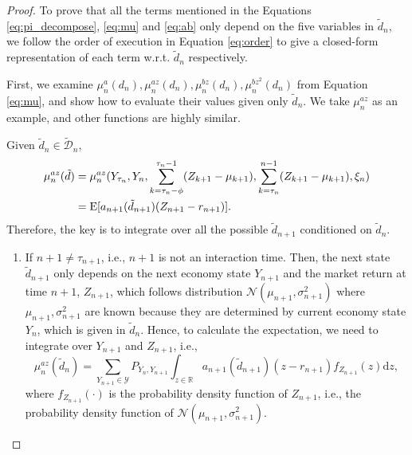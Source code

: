 \begin{proof} To prove that all the terms mentioned in the Equations \eqref{eq:pi_decompose}, \eqref{eq:mu} and \eqref{eq:ab} only depend on the five variables in $\tilde d_n$, we follow the order of execution in Equation \eqref{eq:order} to give a closed-form representation of each term w.r.t. $\tilde d_n$ respectively.

First, we examine $\mu_n^{a}(d_n),\mu_n^{az}(d_n),\mu_n^{bz}(d_n),\mu_n^{bz^2}(d_n)$ from Equation \eqref{eq:mu}, and show how to evaluate their values given only $\tilde d_n$. We take $\mu_n^{az}$ as an example, and other functions are highly similar.

Given $\tilde d_n\in\tilde{\mathcal{D}}_n$,
$$\begin{aligned}
\mu_n^{az}(\tilde d)&=\mu_n^{az}(Y_{\tau_n}, Y_n,\sum_{k=\tau_n-\phi}^{\tau_n-1}(Z_{k+1}-\mu_{k+1}),\sum_{k=\tau_n}^{n-1}(Z_{k+1}-\mu_{k+1}),\xi_n)\\
&=\mathrm{E}[a_{n+1}(\tilde d_{n+1})(Z_{n+1}-r_{n+1})].
\end{aligned}$$
Therefore, the key is to integrate over all the possible $\tilde d_{n+1}$ conditioned on $\tilde d_n$.
\begin{enumerate}
    \item If $n+1\neq\tau_{n+1}$, i.e., $n+1$ is not an interaction time. Then, the next state $\tilde d_{n+1}$ only depends on the next economy state $Y_{n+1}$ and the market return at time $n+1$, $Z_{n+1}$, which follows distribution $\mathcal{N}(\mu_{n+1},\sigma^2_{n+1})$ where $\mu_{n+1},\sigma^2_{n+1}$ are known because they are determined by current economy state $Y_n$, which is given in $\tilde d_n$. Hence, to calculate the expectation, we need to integrate over $Y_{n+1}$ and $Z_{n+1}$, i.e., \begin{equation}\label{eq:not_inter}
        \mu_{n}^{az}(\tilde d_n)=\sum_{Y_{n+1}\in\mathcal Y}P_{Y_{n},Y_{n+1}} \int_{z\in\mathbb{R}} {a_{n+1}(\tilde d_{n+1})}(z-r_{n+1})f_{Z_{n+1}}(z)\mathrm{d}z,
    \end{equation} where $f_{Z_{n+1}}(\cdot)$ is the probability density function of $Z_{n+1}$, i.e., the probability density function of $\mathcal N(\mu_{n+1},\sigma_{n+1}^2)$.


\end{enumerate}
\end{proof}
